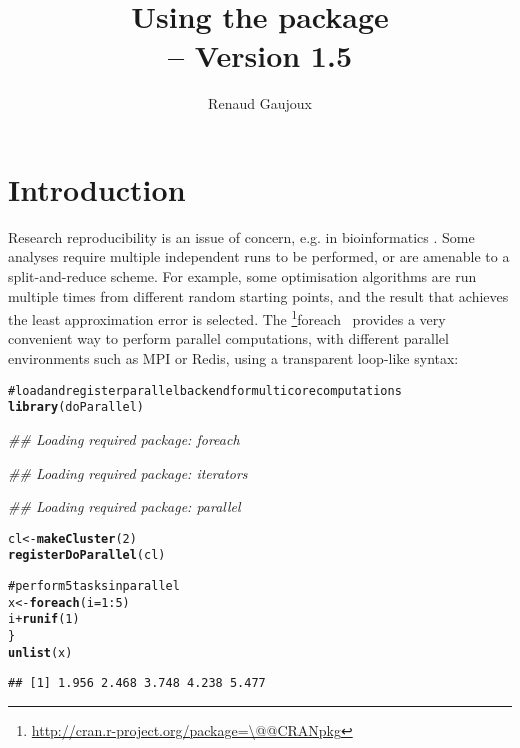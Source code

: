 \documentclass[a4paper,12pt]{article}\usepackage{graphicx, color}
\title{Using the \code{doRNG} package\\
{\small \Rpkg{doRNG} -- Version 1.5}}
\author{Renaud Gaujoux}
\makeatletter
\newcommand{\hlfunctioncall}[1]{\textcolor[rgb]{0.501960784313725,0,0.329411764705882}{\textbf{#1}}}%
\newcommand{\hlcomment}[1]{\textcolor[rgb]{0.180392156862745,0.6,0.341176470588235}{#1}}%
\newenvironment{kframe}{%
 \def\at@end@of@kframe{}%
 \ifinner\ifhmode%
  \def\at@end@of@kframe{\end{minipage}}%
  \begin{minipage}{\columnwidth}%
 \fi\fi%
 \def\FrameCommand##1{\hskip\@totalleftmargin \hskip-\fboxsep
 \colorbox{shadecolor}{##1}\hskip-\fboxsep
     \hskip-\linewidth \hskip-\@totalleftmargin \hskip\columnwidth}%
 \MakeFramed {\advance\hsize-\width
   \@totalleftmargin\z@ \linewidth\hsize
   \@setminipage}}%
 {\par\unskip\endMakeFramed%
 \at@end@of@kframe}
\newenvironment{knitrout}{}{} %
\renewenvironment{knitrout}{\begin{footnotesize}}{\end{footnotesize}}
\newcommand{\pkgname}[1]{\textit{#1}\xspace}
\newcommand{\CRANurl}[1]{\url{http://cran.r-project.org/package=#1}}
\def\CRANpkg{\@ifstar\@CRANpkg\@@CRANpkg}
\def\@CRANpkg#1{\href{http://cran.r-project.org/package=#1}{\pkgname{#1}}\footnote{\CRANurl{#1}}}
\def\@@CRANpkg#1{\href{http://cran.r-project.org/package=#1}{\pkgname{#1}} package\footnote{\CRANurl{#1}}}
\newcommand{\citeCRANpkg}[1]{\CRANpkg{#1}~\cite{#1}}
\makeatother
\begin{document}
\maketitle

\tableofcontents

\section*{Introduction}

Research reproducibility is an issue of concern, e.g. in bioinformatics
\cite{Hothorn2011,Stodden2011,Ioannidis2008}.
Some analyses require multiple independent runs to be performed, or are amenable to a split-and-reduce scheme.
For example, some optimisation algorithms are run multiple times from different
random starting points, and the result that achieves the least approximation error is selected.
The \citeCRANpkg{foreach} provides a very convenient way to perform parallel computations, with different parallel environments such as MPI or Redis, using a transparent loop-like syntax:




\begin{knitrout}
\color{fgcolor}\begin{kframe}
\begin{alltt}
\hlcomment{# load and register parallel backend for multicore computations}
\hlfunctioncall{library}(doParallel)
\end{alltt}


{\ttfamily\noindent\itshape\textcolor{messagecolor}{\#\# Loading required package: foreach}}

{\ttfamily\noindent\itshape\textcolor{messagecolor}{\#\# Loading required package: iterators}}

{\ttfamily\noindent\itshape\textcolor{messagecolor}{\#\# Loading required package: parallel}}\begin{alltt}
cl <- \hlfunctioncall{makeCluster}(2)
\hlfunctioncall{registerDoParallel}(cl)

\hlcomment{# perform 5 tasks in parallel}
x <- \hlfunctioncall{foreach}(i = 1:5) %dopar% \{
    i + \hlfunctioncall{runif}(1)
\}
\hlfunctioncall{unlist}(x)
\end{alltt}
\begin{verbatim}
## [1] 1.956 2.468 3.748 4.238 5.477
\end{verbatim}
\end{kframe}
\end{knitrout}
\end{document}
